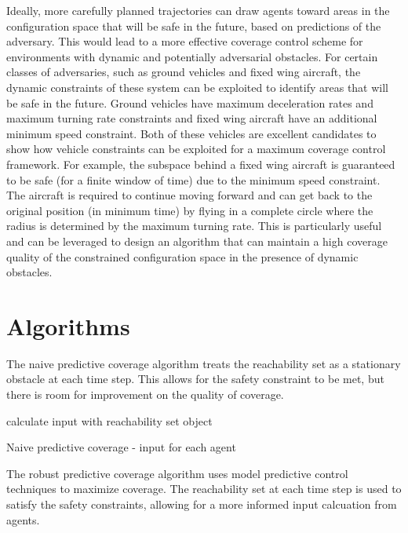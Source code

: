 \documentclass{article}
\begin{document}
Ideally, more carefully planned trajectories can draw agents toward areas in the configuration space that will be safe in the future, based on predictions of the adversary. This would lead to a more effective coverage control scheme for environments with dynamic and potentially adversarial obstacles. For certain classes of adversaries, such as ground vehicles and fixed wing aircraft, the dynamic constraints of these system can be exploited to identify areas that will be safe in the future. Ground vehicles have maximum deceleration rates and maximum turning rate constraints and fixed wing aircraft have an additional minimum speed constraint. Both of these vehicles are excellent candidates to show how vehicle constraints can be exploited for a maximum coverage control framework. For example, the subspace behind a fixed wing aircraft is guaranteed to be safe (for a finite window of time) due to the minimum speed constraint. The aircraft is required to continue moving forward and can get back to the original position (in minimum time) by flying in a complete circle where the radius is determined by the maximum turning rate. This is particularly useful and can be leveraged to design an algorithm that can maintain a high coverage quality of the constrained configuration space in the presence of dynamic obstacles.



\section{Algorithms}

The naive predictive coverage algorithm treats the reachability set as a stationary obstacle at each time step. This allows for the safety constraint to be met, but there is room for improvement on the quality of coverage.

\vspace{2mm}

\begin{algorithm}[H]
\SetAlgoLined 
	calculate input with reachability set object\;
\caption{Naive predictive coverage - input for each agent}
\end{algorithm}

\vspace{5mm}

The robust predictive coverage algorithm uses model predictive control techniques to maximize coverage. The reachability set at each time step is used to satisfy the safety constraints, allowing for a more informed input calcuation from agents. 
\end{document}
